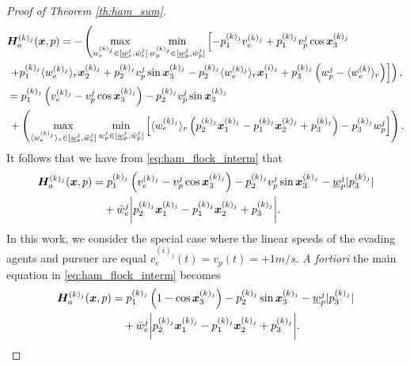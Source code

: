 \begin{proof}[Proof of Theorem \ref{th:ham_sum}]
\begin{align}
\begin{split}
		&\bm{H}^{(k)_j}_a(\bm{x}, p)=- \left(\max_{w_e^{(k)_j} \in [\underline{w}_e^j, \bar{w}_e^j]}  \min_{w_p^{(k)_j}  \in [\underline{w}_p^{j}, \bar{w}_p^j]}  
		\left[
		-p_1^{(k)_j} v_e^{(k)_j} + p_1^{(k)_j} v_p^{j} \cos \bm{x}_3^{(k)_j} 
		\right. \right.  \\ 
		& \left. \left. +  p_1^{(k)_j}\langle w_e^{(k)_j} \rangle_r \bm{x}_2^{(k)_j} 
		+ p_2^{(k)_j} v_p^{j} \sin \bm{x}_3^{(k)_j} - p_2^{(k)_j} \langle w_e^{(k)_j} \rangle_r  \bm{x}_1^{(i)_j} 
		+ p_3^{(k)_j}\left(w_p^j - \langle w_e^{(k)} \rangle_r\right)
		\right] 
		\right),
		\\
		&=p_1^{(k)_j} \left(v_e^{(k)_j} - v_p^{j} \cos \bm{x}_3^{(k)_j}\right) -  p_2^{(k)_j} v_p^{j} \sin \bm{x}_3^{(k)_j}  \\
		& \, + \left(		
		\max_{\langle w_e^{(k)_j}\rangle_r \in [\underline{w}_e^j, \bar{w}_e^j]}  \min_{w_p^{j}  \in [\underline{w}_p^{j}, \bar{w}_p^j]} \begin{bmatrix}
			\langle w_e^{(k)_j}\rangle_r \left(p_2^{(k)_j} \bm{x}_1^{(k)_j} - p_1^{(k)_j}  \bm{x}_2^{(k)_j} + p_3^{(k)_j}\right) 
			- p_3^{(k)_j} w_p^j 
		\end{bmatrix}
		\right).
	\end{split}
	\label{eq:ham_flock_interm}
\end{align}
%
It follows that we have from \eqref{eq:ham_flock_interm} that 
%
\begin{align}
	\bm{H}^{(k)_j}_a(\bm{x}, p) &= p_1^{(k)_j} \left(v_e^{(k)_j} - v_p^{j} \cos \bm{x}_3^{(k)_j}\right) - p_2^{(k)_j} v_p^{j}  \sin \bm{x}_3^{(k)_j} - \underline{w}_p^j |p_3^{(k)_j}| \nonumber 	\\
	& \quad +  \bar{w}_e^j \bigg|p_2^{(k)_j} \bm{x}_1^{(k)_j} - p_1^{(k)_j}\bm{x}_2^{(k)_j} + p_3^{(k)_j}\bigg|.
\end{align}
%
In this work, we consider the special case where the linear speeds of the evading agents and pursuer are equal \ie $v_e^{(i)_j}(t) = v_p(t) = +1 m/s$.  \textit{A fortiori} the main equation in \eqref{eq:ham_flock_interm} becomes 
%
\begin{align}
	\bm{H}^{(k)_j}_a(\bm{x}, p) &= p_1^{(k)_j} \left(1 - \cos \bm{x}_3^{(k)_j}\right) - p_2^{(k)_j} \sin \bm{x}_3^{(k)_j} - \underline{w}_p^j |p_3^{(k)_j}| \nonumber 	\\
	& \quad +  \bar{w}_e^j \bigg|p_2^{(k)_j} \bm{x}_1^{(k)_j} - p_1^{(k)_j}\bm{x}_2^{(k)_j} + p_3^{(k)_j}\bigg|  .
\end{align}
%
\end{proof}